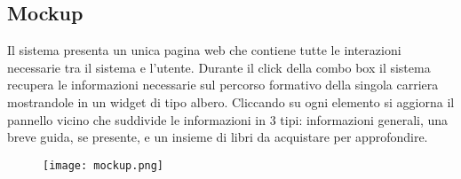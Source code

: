 \subsection{Mockup}
Il sistema presenta un unica pagina web che contiene tutte le interazioni necessarie tra il sistema e l'utente. Durante il click della combo box il sistema recupera le informazioni necessarie sul percorso formativo della singola carriera mostrandole in un widget di tipo albero. Cliccando su ogni elemento si aggiorna il pannello vicino che suddivide le informazioni in 3 tipi: informazioni generali, una breve guida, se presente, e un insieme di libri da acquistare per approfondire.
\begin{figure}[H]
\begin{center}
 \texttt{[image: mockup.png]}
\end{center}
\end{figure}
